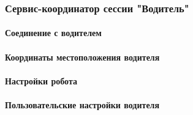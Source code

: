 \subsubsection{Сервис-координатор сессии "Водитель"} 

	\paragraph{Соединение с водителем}

	\paragraph{Координаты местоположения водителя}

	\paragraph{Настройки робота}

	\paragraph{Пользовательские настройки водителя} \label{server_driver_user_settings}